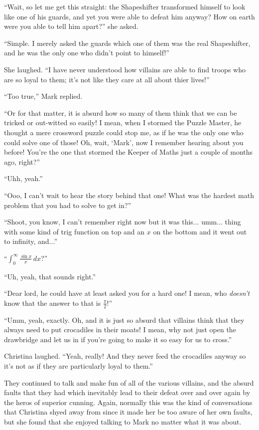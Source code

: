 \documentclass[showtrims,b6paper,draft,10pt]{memoir}
\begin{document}
``Wait, so let me get this straight:  the Shapeshifter transformed himself to look like one of his guards, and yet you were able to defeat him anyway?  How on earth were you able to tell him apart?''  she asked.

``Simple.  I merely asked the guards which one of them was the real Shapeshifter, and he was the only one who didn't point to himself!''

She laughed.  ``I have never understood how villains are able to find troops who are so loyal to them;  it's not like they care at all about thier lives!''

``Too true,''  Mark replied.

``Or for that matter, it is absurd how so many of them think that we can be tricked or out-witted so easily!  I mean, when I stormed the Puzzle Master, he thought a mere crossword puzzle could stop me, as if he was the only one who could solve one of those!  Oh, wait, `Mark', now I remember hearing about you before!  You're the one that stormed the Keeper of Maths just a couple of months ago, right?''

``Uhh, yeah.''

``Ooo, I can't wait to hear the story behind that one!  What was the hardest math problem that you had to solve to get in?''

``Shoot, you know, I can't remember right now but it was this... umm... thing with some kind of trig function on top and an $x$ on the bottom and it went out to infinity, and...''

``$\int_0^{\infty}\!\frac{\sin x}{x}\,dx$?''

``Uh, yeah, that sounds right.''

``Dear lord, he could have at least asked you for a hard one!  I mean, who \emph{doesn't} know that the answer to that is $\frac{\pi}{2}$!''

``Umm, yeah, exactly.  Oh, and it is just so absurd that villains think that they always need to put crocadiles in their moats!  I mean, why not just open the drawbridge and let us in if you're going to make it so easy for us to cross.''

Christina laughed.  ``Yeah, really!  And they never feed the crocadiles anyway so it's not as if they are particularly loyal to them.''

They continued to talk and make fun of all of the various villains, and the absurd faults that they had which inevitably lead to their defeat over and over again by the heros of superior cunning.  Again, normally this was the kind of conversations that Christina shyed away from since it made her be too aware of her own faults, but she found that she enjoyed talking to Mark no matter what it was about.
\end{document}
